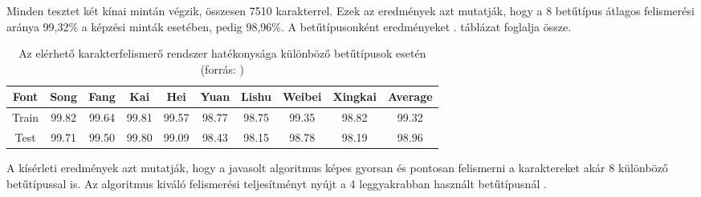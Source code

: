 Minden tesztet két kínai mintán végzik, összesen 7510 karakterrel. Ezek az eredmények azt mutatják, hogy a 8 betűtípus átlagos felismerési aránya 99,32\% a képzési minták esetében, pedig 98,96\%. A betűtípusonként eredményeket . táblázat foglalja össze.

\begin{table}
\centering
\begin{tabular}{ |c|c|c|c|c|c|c|c|c|c|}
\hline
Font & Song & Fang & Kai & Hei & Yuan & Lishu & Weibei & Xingkai & Average\\
\hline
Train & 99.82 & 99.64 & 99.81 & 99.57 & 98.77 & 98.75 & 99.35 & 98.82 & 99.32\\
\hline
Test & 99.71 & 99.50 & 99.80 & 99.09 & 98.43 & 98.15 & 98.78 & 98.19 & 98.96\\
\hline
\end{tabular}
\caption{Az elérhető karakterfelismerő rendszer hatékonysága különböző betűtípusok esetén (forrás: \cite{wu2002recognition})}
\label{tab:ccr_results}
\end{table}

A kísérleti eredmények azt mutatják, hogy a javasolt algoritmus képes gyorsan és pontosan felismerni a karaktereket akár 8 különböző betűtípussal is. Az algoritmus kiváló felismerési teljesítményt nyújt a 4 leggyakrabban használt betűtípusnál \cite{wu2002recognition}.
